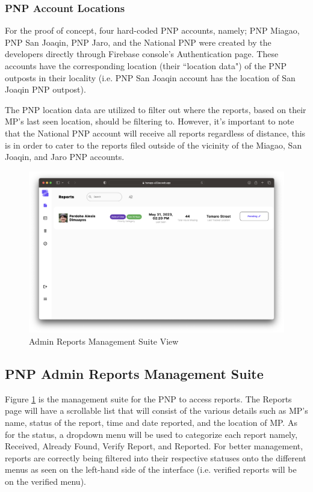 \subsubsection{PNP Account Locations}

For the proof of concept, four hard-coded PNP accounts, namely; PNP Miagao, PNP San Joaqin, PNP Jaro, and the National PNP were created by the developers directly through Firebase console's Authentication page. These accounts have the corresponding location (their ``location data") of the PNP outposts in their locality (i.e. PNP San Joaqin account has the location of San Joaqin PNP outpost). 

The PNP location data are utilized to filter out where the reports, based on their MP's last seen location, should be filtering to. However, it's important to note that the National PNP account will receive all reports regardless of distance, this is in order to cater to the reports filed outside of the vicinity of the Miagao, San Joaqin, and  Jaro PNP accounts.

\begin{figure}[!h]
    \centering
    \includegraphics[scale=0.25]{figures/Chapter4/PNP/Pending.png}
    \caption{Admin Reports Management Suite View}
    \label{fig:PNP2}
\end{figure}
\subsection{PNP Admin Reports Management Suite}

Figure \ref{fig:PNP2} is the management suite for the PNP to access reports. The Reports page will have a scrollable list that will consist of the various details such as MP’s name, status of the report, time and date reported, and the location of MP. As for the status, a dropdown menu will be used to categorize each report namely, Received, Already Found, Verify Report, and Reported. For better management, reports are correctly being filtered into their respective statuses onto the different menus as seen on the left-hand side of the interface (i.e. verified reports will be on the verified menu).

